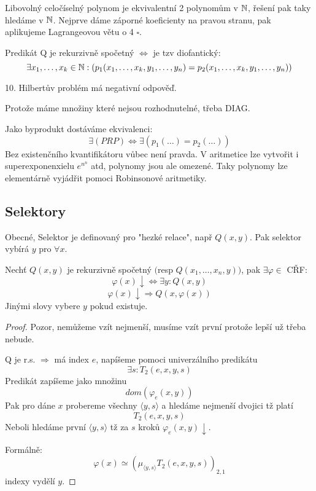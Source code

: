 Libovolný celočíselný polynom je ekvivalentní 2 polynomům v $\operatorname{\mathbb{N}}$, řešení pak taky hledáme v $\operatorname{\mathbb{N}}$.
Nejprve dáme záporné koeficienty na pravou stranu, pak aplikujeme Lagrangeovou větu o 4 $\square$.

\begin{theorem}[RDPM (BD)]\label{rdpm}
	Predikát Q je rekurzivně spočetný $\iff$ je tzv diofantický:
		\[ \exists x_1, \ldots, x_k \in \operatorname{\mathbb{N}}: (p_1(x_1, \ldots, x_k, y_1, \ldots, y_n) = p_2(x_1, \ldots, x_k, y_1, \ldots, y_n)) \]
\end{theorem}

\begin{consequence}
	10. Hilbertův problém má negativní odpověď.

	Protože máme množiny které nejsou rozhodnutelné, třeba DIAG.
\end{consequence}

\begin{amendment}\label{rdpm_am}
	Jako byprodukt dostáváme ekvivalenci:
	\[ \exists(PRP) \iff \exists(p_1(\ldots) = p_2(\ldots)) \]
	Bez existenčního kvantifikátoru vůbec není pravda.
	V aritmetice lze vytvořit i superexponenxielu $e^{n^n}$ atd, polynomy jsou ale omezené.
	Taky polynomy lze elementárně vyjádřit pomoci Robinsonové aritmetiky.
\end{amendment}

\subsection{Selektory}

Obecné, Selektor je definovaný pro "hezké relace", např $Q(x, y)$.
Pak selektor vybírá $y$ pro $\forall x$.

\begin{theorem}[O selektoru]\label{selector}
	Nechť $Q(x, y)$ je rekurzivně spočetný $($resp $Q(x_1, \ldots, x_n, y))$, pak $\exists \varphi \in$ CŘF:
	\[ \varphi(x) \downarrow \iff \exists y: Q(x, y) \]
		\[ \varphi(x) \downarrow \Rightarrow Q(x, \varphi(x)) \]
	Jinými slovy vybere $y$ pokud existuje.
\end{theorem}
\begin{proof}
	Pozor, nemůžeme vzít nejmenší, musíme vzít první protože lepší už třeba nebude.

	Q je r.s. $\Rightarrow$ má index $e$, napíšeme pomoci univerzálního predikátu
	\[ \exists s: T_2(e, x, y, s) \]
	Predikát zapíšeme jako množinu
	\[ dom(\varphi_e(x, y)) \]
	Pak pro dáne $x$ probereme všechny $\langle y, s \rangle$ a hledáme nejmenší dvojici tž platí
	\[ T_2(e, x, y, s) \]
	Neboli hledáme první $\langle y, s \rangle$ tž za $s$ kroků $\varphi_e(x,y) \downarrow$.

	Formálně:
	\[ \varphi(x) \simeq (\mu_{\langle y, s \rangle} T_2(e, x, y, s))_{2,1} \]
	indexy vydělí $y$.
\end{proof}

